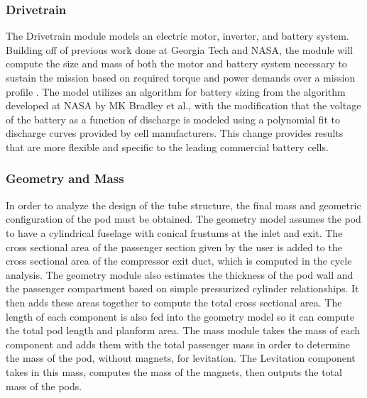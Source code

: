 \subsubsection{Drivetrain}
	The Drivetrain module models an electric motor, inverter, and battery system.
	Building off of previous work done at Georgia Tech and NASA, the module
	will compute the size and mass of both the motor and battery system
	necessary to sustain the mission based on required torque and power demands
	over a mission profile \cite{GeorgiaTechMotor, NASASugar}. The model
	utilizes an algorithm for battery sizing from the algorithm
	developed at NASA by MK Bradley et al.\cite{NASASugar}, with the modification that the
	voltage of the battery as a function of discharge is modeled using a
	polynomial fit to discharge curves provided by cell manufacturers.
	This change provides results that are more flexible and specific to the
	leading commercial battery cells.
\subsubsection{Geometry and Mass}
	In order to analyze the design of the tube structure, the final mass and
	geometric configuration of the pod must be obtained. The geometry model
	assumes the pod to have a cylindrical fuselage with conical frustums at
	the inlet and exit. The cross sectional area of the passenger section
	given by the user is added to the cross sectional area of the compressor
	exit duct, which is computed in the cycle analysis. The geometry module
	also estimates the thickness of the pod wall and the passenger compartment
	based on simple pressurized cylinder relationships. It then adds these areas
	together to compute the total cross sectional area. The length of each
	component is also fed into the geometry model so it can compute the total
	pod length and planform area. The mass module takes the mass of each
	component and adds them with the total passenger mass in order to determine
	the mass of the pod, without magnets, for levitation. The Levitation component
	takes in this mass, computes the mass of the magnets, then outputs the total mass of the pods.
